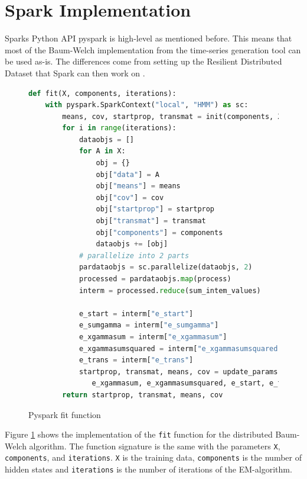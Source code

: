 \section{Spark Implementation}

Sparks Python API pyspark is high-level as mentioned before. This means that most of the Baum-Welch implementation from the time-series generation tool can be used as-is. The differences come from setting up the Resilient Distributed Dataset that Spark can then work on \parencite{sparkhmm}.

\begin{figure}
\begin{singlespace}
\begin{lstlisting}[language=Python]
def fit(X, components, iterations):
    with pyspark.SparkContext("local", "HMM") as sc:
        means, cov, startprop, transmat = init(components, X)
        for i in range(iterations):
            dataobjs = []
            for A in X:
                obj = {}
                obj["data"] = A
                obj["means"] = means
                obj["cov"] = cov
                obj["startprop"] = startprop
                obj["transmat"] = transmat
                obj["components"] = components
                dataobjs += [obj]
            # parallelize into 2 parts
            pardataobjs = sc.parallelize(dataobjs, 2)
            processed = pardataobjs.map(process)
            interm = processed.reduce(sum_intem_values)

            e_start = interm["e_start"]
            e_sumgamma = interm["e_sumgamma"]
            e_xgammasum = interm["e_xgammasum"]
            e_xgammasumsquared = interm["e_xgammasumsquared"]
            e_trans = interm["e_trans"]
            startprop, transmat, means, cov = update_params(e_sumgamma, \
               e_xgammasum, e_xgammasumsquared, e_start, e_trans)
        return startprop, transmat, means, cov
\end{lstlisting}
\end{singlespace}
\caption{Pyspark fit function}    
\label{fig:pyspark-fit-listing}
\end{figure}

Figure \ref{fig:pyspark-fit-listing} shows the implementation of the \texttt{fit} function for the distributed Baum-Welch algorithm. The function signature is the same with the parameters \texttt{X}, \texttt{components}, and \texttt{iterations}. \texttt{X} is the training data, \texttt{components} is the number of hidden states and \texttt{iterations} is the number of iterations of the EM-algorithm. 

